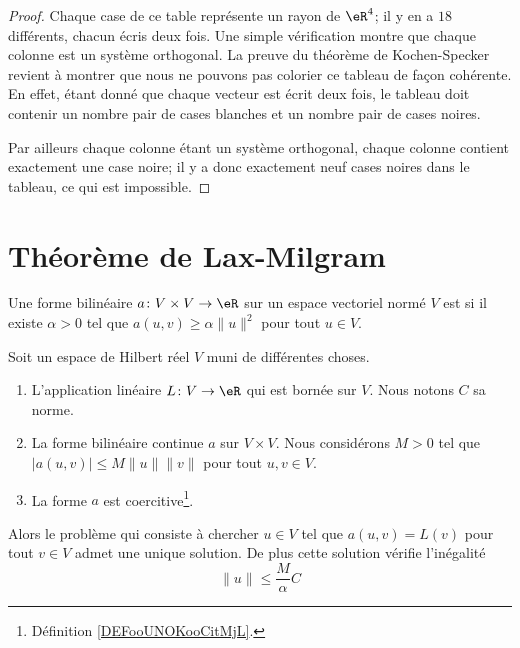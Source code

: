 \begin{proof}
    Chaque case de ce table représente un rayon de \( \eR^4\); il y en a \( 18\) différents, chacun écris deux fois. Une simple vérification montre que chaque colonne est un système orthogonal. La preuve du théorème de Kochen-Specker revient à montrer que nous ne pouvons pas colorier ce tableau de façon cohérente. En effet, étant donné que chaque vecteur est écrit deux fois, le tableau doit contenir un nombre pair de cases blanches et un nombre pair de cases noires.

    Par ailleurs chaque colonne étant un système orthogonal, chaque colonne contient exactement une case noire; il y a donc exactement neuf cases noires dans le tableau, ce qui est impossible.

\end{proof}

\section{Théorème de Lax-Milgram}

\begin{definition}      \label{DEFooUNOKooCitMjL}
    Une forme bilinéaire \( a\colon V\times V\to \eR\) sur un espace vectoriel normé \( V\) est  si il existe \( \alpha>0\) tel que \(  a(u,v)\geq \alpha\| u \|^2 \) pour tout \( u\in V\).
\end{definition}

\begin{theorem}       \label{THOooLLUXooHyqmVL}
    Soit un espace de Hilbert réel \( V\) muni de différentes choses.
    \begin{enumerate}
        \item
            L'application linéaire \( L\colon V\to \eR\) qui est bornée sur \( V\). Nous notons \( C\) sa norme.
        \item
            La forme bilinéaire continue \( a\) sur \( V\times V\). Nous considérons \( M>0\) tel que \( | a(u,v) |\leq M\| u \|\| v \|\) pour tout \( u,v\in V\).
        \item
            La forme \( a\) est coercitive\footnote{Définition \ref{DEFooUNOKooCitMjL}.}.
    \end{enumerate}
    Alors le problème qui consiste à chercher \( u\in V\) tel que \( a(u,v)=L(v)\) pour tout \( v\in V\) admet une unique solution. De plus cette solution vérifie l'inégalité
    \begin{equation}        \label{EQooUAYSooKYyQBU}
        \| u \|\leq \frac{ M }{ \alpha }C
    \end{equation}
\end{theorem}


